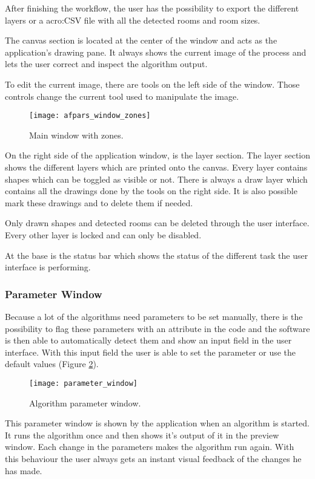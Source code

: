 After finishing the workflow, the user has the possibility to export the different layers or a \gls{acro:CSV} file with all the detected rooms and room sizes.

The canvas section is located at the center of the window and acts as the application's drawing pane. It always shows the current image of the process and lets the user correct and inspect the algorithm output.

To edit the current image, there are tools on the left side of the window. Those controls change the current tool used to manipulate the image.


\begin{figure}[h!]
  \centering
      \texttt{[image: afpars\_window\_zones]}
  \caption{Main window with zones.}
  \label{fig:afpars_window_zones}
\end{figure}

On the right side of the application window, is the layer section. The layer section shows the different layers which are printed onto the canvas. Every layer contains shapes which can be toggled as visible or not. There is always a draw layer which contains all the drawings done by the tools on the right side. It is also possible mark these drawings and to delete them if needed.

Only drawn shapes and detected rooms can be deleted through the user interface. Every other layer is locked and can only be disabled.

At the base is the status bar which shows the status of the different task the user interface is performing.


\subsubsection{Parameter Window} \label{sub:parameter_window}
Because a lot of the algorithms need parameters to be set manually, there is the possibility to flag these parameters with an attribute in the code and the software is then able to automatically detect them and show an input field in the user interface. With this input field the user is able to set the parameter or use the default values (Figure \ref{fig:parameter_window}).


\begin{figure}[h!]
  \centering
      \texttt{[image: parameter\_window]}
  \caption{Algorithm parameter window.}
  \label{fig:parameter_window}
\end{figure}

This parameter window is shown by the application when an algorithm is started. It runs the algorithm once and then shows it's output of it in the preview window. Each change in the parameters makes the algorithm run again. With this behaviour the user always gets an instant visual feedback of the changes he has made.